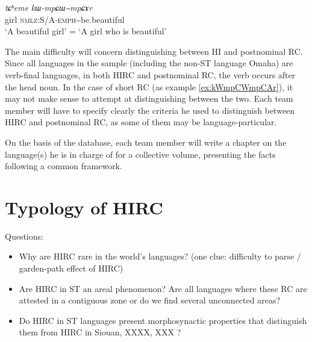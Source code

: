 \documentclass[oneside,a4paper,11pt]{article}
\newcommand{\ipa}[1]{\mbox{\phon\textit{#1}}} %
\newcommand{\tld}{\textasciitilde{}}
\begin{document}
\begin{exe}
\ex \label{ex:kWmpCWmpCAr}
\gll 
\ipa{tɕʰeme} \ipa{kɯ-mpɕɯ\tld{}mpɕɤr} \\
girl \textsc{nmlz:S/A-emph}\tld{}be.beautiful \\
\glt `A beautiful girl' = `A girl who is beautiful'
\end{exe}

The main difficulty will concern distinguishing between HI and postnominal RC. Since all languages in the sample (including the non-ST language Omaha) are verb-final languages, in both HIRC and postnominal RC, the verb occurs after the head noun. In the case of short RC (as example \ref{ex:kWmpCWmpCAr}), it may not make sense to attempt at distinguishing between the two. Each team member will have to specify clearly the criteria he used to distinguish between HIRC and postnominal RC, as some of them may be language-particular.

On the basis of the database, each team member will write a chapter on the language(s) he is in charge of for a collective volume, presenting the facts following a common framework.

\section{Typology of HIRC}
Questions:

\begin{itemize}
\item Why are HIRC rare in the world's languages? (one clue: difficulty to parse / garden-path effect of HIRC)
\item Are HIRC in ST an areal phenomenon? Are all languages where these RC are attested in a contiguous zone or do we find several unconnected areas?
\item Do HIRC in ST languages present morphosynactic properties that distinguish them from HIRC in Siouan, XXXX, XXX ?
\end{itemize}



\end{document}
